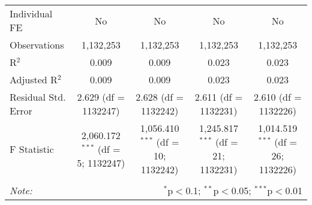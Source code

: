 \documentclass[
]{article}
\begin{document}
\begin{table}[!htbp]
{\begin{tabular}{@{\extracolsep{5pt}}lcccc}
Individual FE & No & No & No & No \\ 
Observations & 1,132,253 & 1,132,253 & 1,132,253 & 1,132,253 \\ 
R$^{2}$ & 0.009 & 0.009 & 0.023 & 0.023 \\ 
Adjusted R$^{2}$ & 0.009 & 0.009 & 0.023 & 0.023 \\ 
Residual Std. Error & 2.629 (df = 1132247) & 2.628 (df = 1132242) & 2.611 (df = 1132231) & 2.610 (df = 1132226) \\ 
F Statistic & 2,060.172$^{***}$ (df = 5; 1132247) & 1,056.410$^{***}$ (df = 10; 1132242) & 1,245.817$^{***}$ (df = 21; 1132231) & 1,014.519$^{***}$ (df = 26; 1132226) \\ 
\hline 
\hline \\[-1.8ex] 
\textit{Note:}  & \multicolumn{4}{r}{$^{*}$p$<$0.1; $^{**}$p$<$0.05; $^{***}$p$<$0.01} \\ 
\end{tabular}
} 
\end{table} 
\newpage
\end{document}
